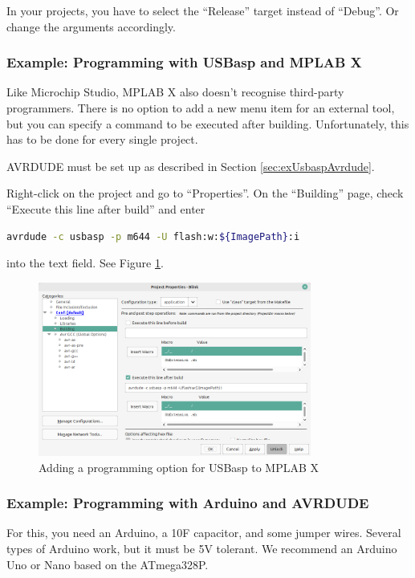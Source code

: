 \documentclass{article}
\newenvironment{note}{\begin{tcolorbox}[colback=blue!5!white,colframe=blue!75!black,title=\textbf{Note}]}{\end{tcolorbox}}
\begin{document}
\begin{note}
In your projects, you have to select the ``Release'' target instead of ``Debug''. Or change the arguments accordingly. 
\end{note}

\subsubsection{Example: Programming with USBasp and MPLAB X}\label{sec:exMPLABX}
Like Microchip Studio, MPLAB X also doesn't recognise third-party programmers. There is no option to add a new menu item for an external tool, but you can specify a command to be executed after building. Unfortunately, this has to be done for every single project. 

AVRDUDE must be set up as described in Section \ref{sec:exUsbaspAvrdude}. 

Right-click on the project and go to ``Properties''. On the ``Building'' page, check ``Execute this line after build'' and enter
\begin{lstlisting}[language=bash]
avrdude -c usbasp -p m644 -U flash:w:${ImagePath}:i
\end{lstlisting}
into the text field. See Figure \ref{fig:AvrdudeMPLABX}. 

\begin{figure}[htb]
\centering
\includegraphics[width=0.8\textwidth]{Pictures/AvrdudeMPLABX.png}
\caption{Adding a programming option for USBasp to MPLAB X}
\label{fig:AvrdudeMPLABX}
\end{figure}

\FloatBarrier

\subsubsection{Example: Programming with Arduino and AVRDUDE}\label{sec:exArduino}
For this, you need an Arduino, a 10\textmu F capacitor, and some jumper wires. Several types of Arduino work, but it must be 5V tolerant. We recommend an Arduino Uno or Nano based on the ATmega328P. 
\end{document}
